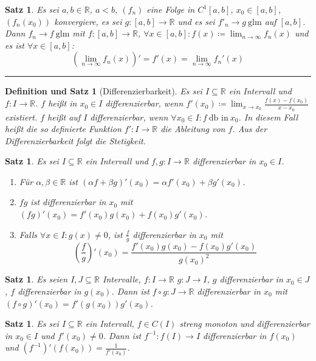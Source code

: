 \documentclass[a4paper]{article}
\newcounter{Sec}
\theoremstyle{marginbreak}
\newtheorem{satz}[definition]{Satz}
\newtheorem{defsatz}[definition]{Definition und Satz}
\newcommand{\sep}{%
	\rule{\textwidth}{0.3pt}%
	\stepcounter{Sec}%
	}
\begin{document}
	\begin{satz}
		Es sei $a,b\in\mathbb{R}$, $a<b$, $(f_n)$ eine Folge in $C^1[a,b]$,
		$x_0\in[a,b]$, $(f_n(x_0))$ konvergiere, es sei $g\colon[a,b]\to\mathbb{R}$
		und es sei $f'_n\to g~\text{glm}$
		auf $[a,b]$. Dann $f_n\to f~\text{glm}$ mit $f\colon[a,b]\to\mathbb{R}$,
		$\forall x\in[a,b]: f(x)\coloneqq\lim_{n\to\infty}f_n(x)$ und es ist $\forall x\in[a,b]$:
		\[ (\lim_{n\to\infty}f_n(x))'=f'(x)=\lim_{n\to\infty}f_n'(x) \]
	\end{satz}
	\sep
	\begin{defsatz}[Differenzierbarkeit]
		Es sei $I\subseteq\mathbb{R}$ ein Intervall und $f\colon I\to\mathbb{R}$.
		$f$ heißt in $x_0\in I$ differenzierbar, wenn
		$f'(x_0)\coloneqq\lim_{x\to x_0}\frac{f(x)-f(x_0)}{x-x_0}$ existiert.
		$f$ heißt auf $I$ differenzierbar, wenn $\forall x_0\in I:f~\text{db in}~x_0$.
		In diesem Fall heißt die so definierte Funktion $f'\colon I\to\mathbb{R}$ die
		Ableitung von $f$. Aus der Differenzierbarkeit folgt die Stetigkeit.
	\end{defsatz}
	\begin{satz}
		Es sei $I\subseteq\mathbb{R}$ ein Intervall und $f,g\colon I\to\mathbb{R}$
		differenzierbar in $x_0\in I$.
		\begin{enumerate}[label=(\alph*)]
			\item Für $\alpha,\beta\in\mathbb{R}$ ist $(\alpha f+\beta g)'(x_0)=\alpha f'(x_0)+\beta g'(x_0)$.
			\item $fg$ ist differenzierbar in $x_0$ mit $(fg)'(x_0)=f'(x_0)g(x_0)+f(x_0)g'(x_0)$.
			\item Falls $\forall x\in I:g(x)\neq0$, ist $\frac{f}{g}$ differenzierbar in $x_0$ mit
				\[ (\frac{f}{g})'(x_0) = \frac{f'(x_0)g(x_0)-f(x_0)g'(x_0)}{g(x_0)^2} \]
		\end{enumerate}
	\end{satz}
	\begin{satz}
		Es seien $I, J\subseteq\mathbb{R}$ Intervalle, $f\colon I\to\mathbb{R}$
		$g\colon J\to I$, $g$ differenzierbar in $x_0\in J$, $f$ differenzierbar
		in $g(x_0)$. Dann ist $f\circ g\colon J\to\mathbb{R}$ differenzierbar in $x_0$
		mit $(f \circ g)'(x_0)=f'(g(x_0))g'(x_0)$.
	\end{satz}
	\begin{satz}
		Es sei $I\subseteq\mathbb{R}$ ein Intervall, $f\in C(I)$ streng monoton und
		differenzierbar in $x_0\in I$ und $f'(x_0)\neq0$. Dann ist $f^{-1}\colon f(I)\to I$
		differenzierbar in $f(x_0)$ und $(f^{-1})'(f(x_0))=\frac{1}{f'(x_0)}$.
	\end{satz}
\end{document}
